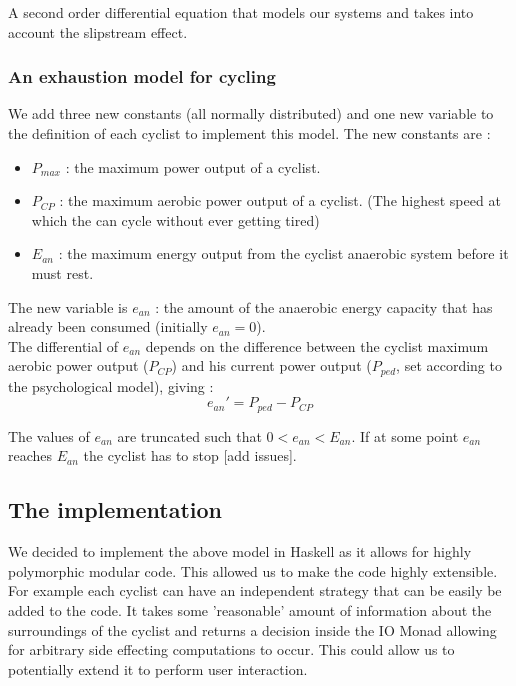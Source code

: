 \documentclass[10pt, a4paper]{report}
\begin{document}
A second order differential equation that models our systems and takes into account the slipstream effect.

\subsubsection{An exhaustion model for cycling}

We add three new constants (all normally distributed) and one new variable to the definition of each cyclist to implement this model. The new constants are :
\begin{itemize}
\item $P_{max}$ : the maximum power output of a cyclist.
\item $P_{CP}$ : the maximum aerobic power output of a cyclist. (The highest speed at which the can cycle without ever getting tired)
\item $E_{an}$ : the maximum energy output from the cyclist anaerobic system before it must rest.
\end{itemize}
The new variable is $e_{an}$ : the amount of the anaerobic energy capacity that has already been consumed (initially $e_{an} = 0$). \\

The differential of $e_{an}$ depends on the difference between the cyclist maximum aerobic power output ($P_{CP}$) and his current power output ($P_{ped}$, set according to the psychological model), giving :
$$ e_{an}' = P_{ped} - P_{CP} $$

The values of $e_{an}$ are truncated such that $0 < e_{an} < E_{an}$. If at some point $e_{an}$ reaches $E_{an}$ the cyclist has to stop [add issues].

\subsection{The implementation}\label{subsec:impl}

We decided to implement the above model in Haskell as it allows for highly polymorphic modular code. This allowed us to make the code highly extensible. For example each cyclist can have an independent strategy that can be easily be added to the code. It takes some 'reasonable' amount of information about the surroundings of the cyclist and returns a decision inside the IO Monad allowing for arbitrary side effecting computations to occur. This could allow us to potentially extend it to perform user interaction. \par
\end{document}

